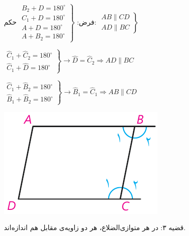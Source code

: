 \documentclass[12pt, a4paper]{book}
\begin{document}
\begin{minipage}{.75\textwidth}
	 فرض: 
	$\left.
	\begin{array}{rrr}
		B_2 + D =180^{\circ} \\
		C_1 + D =180^{\circ} \\
		A + D = 180^{\circ} \\
		A + B_2 = 180^{\circ}
	\end{array}
	\right\}$
	\hfill حکم:
	$ \left. 
	\begin{array}{rrr}
		AB \parallel CD \\
		AD \parallel BC
	\end{array}
 \right\}$
	\begin{flushleft}
		$ \left.
		\begin{array}{rrr} 
			\widehat{C}_1 + \widehat{C}_2 = 180^{\circ} \\
			\widehat{C}_1 + \widehat{D} = 180^{\circ}
		\end{array}
	 \right\}
	  \rightarrow \widehat{D} = \widehat{C}_2 \Rightarrow AD \parallel BC$
	  
	  $\left.
	  \begin{array}{rrr} 
	  	\widehat{C}_1 + \widehat{B}_2 = 180^{\circ} \\
	  	\widehat{B}_1 + \widehat{B}_2 = 180^{\circ}
	  \end{array}
	  \right\}
	  \rightarrow \widehat{B}_1 = \widehat{C}_1 \Rightarrow AB \parallel CD$
	\end{flushleft}
\end{minipage}
\begin{minipage}{.25\textwidth}
	\begin{flushleft}
		\includegraphics[scale=0.8]{"Shapes/Fasl - 3/Dars 1/qazie 2.pdf"}
	\end{flushleft}
\end{minipage}

{\semibold قضیه ۳}: در هر متوازی‌الضلاع، هر دو زاویه‌ی مقابل هم اندازه‌اند.
\end{document}
